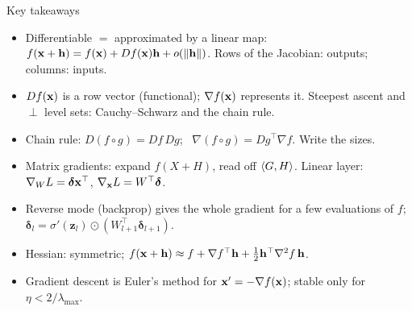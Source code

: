 \documentclass[aspectratio=1610,11pt]{beamer}
\begin{document}
\begin{frame}{Key takeaways}
    \small
    \begin{itemize}
        \item Differentiable $=$ approximated by a linear map: $f(\mathbf{x} + \mathbf{h}) = f(\mathbf{x}) + Df(\mathbf{x})\mathbf{h} + o(\lVert \mathbf{h} \rVert)$. Rows of the Jacobian: outputs; columns: inputs.
        \item $Df(\mathbf{x})$ is a row vector (functional); $\nabla f(\mathbf{x})$ represents it. Steepest ascent and $\perp$ level sets: Cauchy--Schwarz and the chain rule.
        \item Chain rule: $D(f \circ g) = Df\,Dg$; \ $\nabla(f \circ g) = Dg^\top\nabla f$. Write the sizes.
        \item Matrix gradients: expand $f(X + H)$, read off $\langle G, H \rangle$. Linear layer: $\nabla_W L = \boldsymbol{\delta}\mathbf{x}^\top$, $\nabla_{\mathbf{x}}L = W^\top\boldsymbol{\delta}$.
        \item Reverse mode (backprop) gives the whole gradient for a few evaluations of $f$; $\boldsymbol{\delta}_l = \sigma'(\mathbf{z}_l) \odot (W_{l+1}^\top\boldsymbol{\delta}_{l+1})$.
        \item Hessian: symmetric; $f(\mathbf{x} + \mathbf{h}) \approx f + \nabla f^\top\mathbf{h} + \frac{1}{2}\mathbf{h}^\top\nabla^2 f\,\mathbf{h}$.
        \item Gradient descent is Euler's method for $\mathbf{x}' = -\nabla f(\mathbf{x})$; stable only for $\eta < 2/\lambda_{\max}$.
    \end{itemize}
\end{frame}

\end{document}
